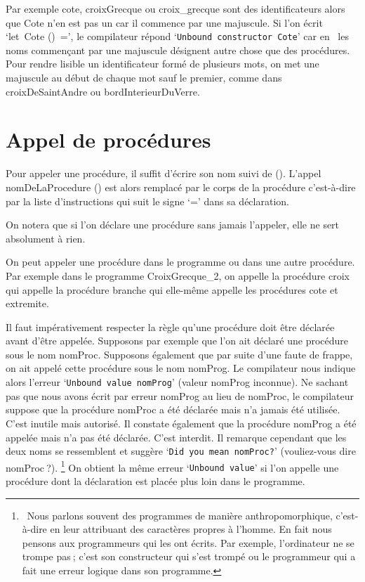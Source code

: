 Par exemple {\idt cote}, {\idt croixGrecque} ou {\idt croix\_grecque} sont des 
identificateurs alors que {\idt Cote} n'en est pas un car il commence par 
une majuscule. Si l'on écrit `{\mcl let}\ {\idt Cote ()\ =}', le compilateur
répond `{\tt Unbound constructor Cote}' car en \ocaml\ les noms commençant
par une majuscule désignent autre chose que des procédures. Pour rendre 
lisible un identificateur formé de plusieurs mots, on
met une majuscule au début de chaque mot sauf le premier, comme dans 
{\idt croixDeSaintAndre} ou {\idt bordInterieurDuVerre}.

\section{Appel de procédures} 

Pour appeler une procédure, il suffit d'écrire son nom suivi 
de {\idt ()}. L'appel {\idt nomDeLaProcedure ()}
est alors remplacé par le corps de la procédure c'est-à-dire par la liste
d'instructions qui suit le signe `{\idt =}' dans sa déclaration.

On notera que si l'on déclare une procédure sans jamais l'appeler, elle 
ne sert absolument à rien. 

On peut appeler une procédure dans le programme ou dans une autre procédure.
Par exemple dans le programme {\idt CroixGrecque\_2}, on appelle 
la procédure {\idt croix} qui appelle la procédure {\idt branche} qui elle-même
appelle les procédures {\idt cote} et {\idt extremite}. 

Il faut impérativement respecter la règle qu'une procédure doit 
être
dé\-cla\-rée avant d'être ap\-pe\-lée. Supposons par exemple que l'on ait
déclaré une pro\-cé\-du\-re sous le nom {\idt nomProc}. Supposons également
que par suite d'une faute de frappe, on ait appelé cette procédure
sous le nom {\idt nomProg}. Le compilateur nous indique alors l'erreur
`{\tt Unbound value nomProg}' (valeur {\idt nomProg} inconnue). Ne sachant pas que 
nous avons écrit par erreur {\idt nomProg} au lieu de {\idt nomProc}, le compilateur 
suppose que la procédure {\idt nomProc} a été déclarée mais n'a jamais été utilisée.
C'est inutile mais autorisé. Il constate également que la procédure
{\idt nomProg} a été appelée mais n'a pas été déclarée. C'est interdit.
Il remarque cependant que les deux noms se ressemblent et suggère
`{\tt Did you mean nomProc?}' (vouliez-vous dire {\idt nomProc}$\:$?).%
\footnote{\ Nous parlons souvent des programmes de manière 
anthropomorphique, c'est-à-dire en leur attribuant des caractères 
propres à l'homme. En fait nous pensons aux programmeurs qui les
ont écrits. Par exemple, l'ordinateur ne se trompe pas$\:$; c'est son 
constructeur qui s'est trompé ou le programmeur qui a fait une erreur 
logique dans son programme.} 
On obtient la même erreur `{\tt Unbound value}' si l'on appelle une procédure
dont la déclaration est placée plus loin dans le programme.

